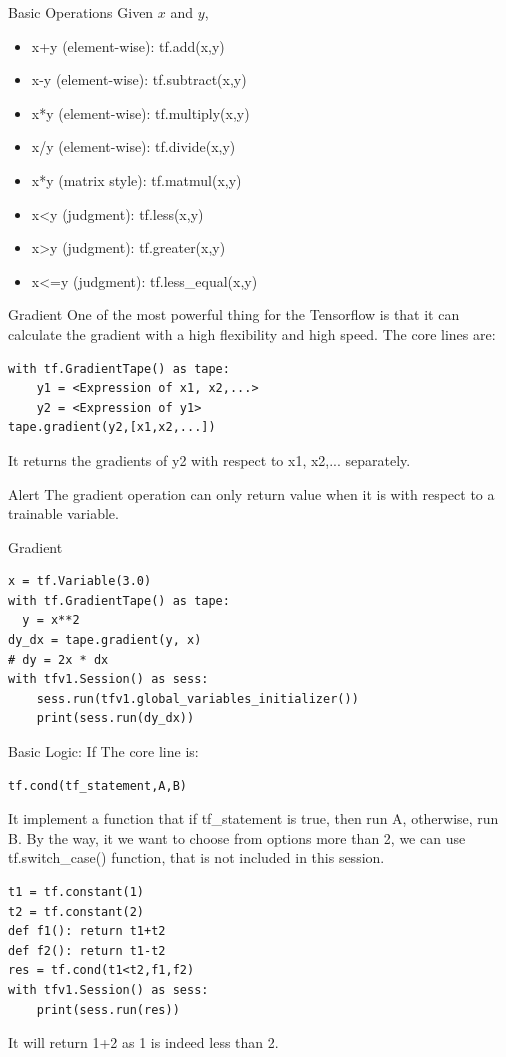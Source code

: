\documentclass{beamer}
\begin{document}
\begin{frame}[fragile]{Basic Operations}
Given $x$ and $y$,
\begin{itemize}
	\item x+y (element-wise): tf.add(x,y)
	\item x-y (element-wise): tf.subtract(x,y)
	\item x*y (element-wise): tf.multiply(x,y)
	\item x/y (element-wise): tf.divide(x,y)
	\item x*y (matrix style): tf.matmul(x,y)
	\item x<y (judgment): tf.less(x,y)
	\item x>y (judgment): tf.greater(x,y)
	\item x<=y (judgment): tf.less\_equal(x,y)
\end{itemize}
\end{frame}

\begin{frame}[fragile]{Gradient}
One of the most powerful thing for the Tensorflow is that it can calculate the gradient with a high flexibility and high speed. The core lines are:
\begin{lstlisting}[style = Python]
with tf.GradientTape() as tape:
	y1 = <Expression of x1, x2,...>
	y2 = <Expression of y1>
tape.gradient(y2,[x1,x2,...])
\end{lstlisting}
It returns the gradients of y2 with respect to x1, x2,... separately.
\begin{alertblock}{Alert}
The gradient operation can only return value when it is with respect to a trainable variable.
\end{alertblock}
\end{frame}


\begin{frame}[fragile]{Gradient}
\begin{lstlisting}[style = Python]
x = tf.Variable(3.0)
with tf.GradientTape() as tape:
  y = x**2
dy_dx = tape.gradient(y, x)
# dy = 2x * dx
with tfv1.Session() as sess:
    sess.run(tfv1.global_variables_initializer())
    print(sess.run(dy_dx))
\end{lstlisting}
\end{frame}


\begin{frame}[fragile]{Basic Logic: If}
The core line is:
\begin{lstlisting}[style = Python]
tf.cond(tf_statement,A,B)
\end{lstlisting}
It implement a function that if tf\_statement is true, then run A, otherwise, run B. By the way, it we want to choose from options more than 2, we can use tf.switch\_case() function, that is not included in this session.
\begin{example}
\begin{lstlisting}[style = Python]
t1 = tf.constant(1)
t2 = tf.constant(2)
def f1(): return t1+t2
def f2(): return t1-t2
res = tf.cond(t1<t2,f1,f2)
with tfv1.Session() as sess:
	print(sess.run(res))
\end{lstlisting}
It will return 1+2 as 1 is indeed less than 2.
\end{example}
\end{frame}
\end{document}
